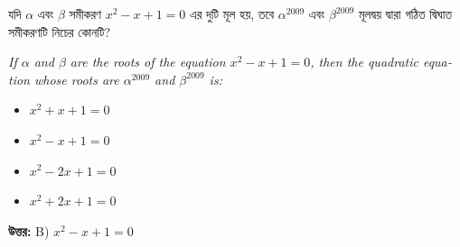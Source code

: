 \documentclass[12pt, a4paper]{article}
\begin{document}
\begin{tcolorbox}[questionbox={প্রশ্ন (Question) 1}]
    \noindent
    যদি $\alpha$ এবং $\beta$ সমীকরণ $x^2 - x + 1 = 0$ এর দুটি মূল হয়, তবে $\alpha^{2009}$ এবং $\beta^{2009}$ মূলদ্বয় দ্বারা গঠিত দ্বিঘাত সমীকরণটি নিচের কোনটি?
    
    \vspace{0.8em}
    \begin{english}
    \noindent\textit{\color{darkgray}
    If $\alpha$ and $\beta$ are the roots of the equation $x^2 - x + 1 = 0$, then the quadratic equation whose roots are $\alpha^{2009}$ and $\beta^{2009}$ is:
    }
    \end{english}
\end{tcolorbox}

\begin{itemize}[label={}, leftmargin=1cm, itemsep=0.5em]
    \item[\textbf{A)}] $x^2 + x + 1 = 0$
    \item[\textbf{B)}] $x^2 - x + 1 = 0$
    \item[\textbf{C)}] $x^2 - 2x + 1 = 0$
    \item[\textbf{D)}] $x^2 + 2x + 1 = 0$
\end{itemize}

\vspace{0.5em}
\begin{tcolorbox}[answerbox]
    \textbf{\color{success} উত্তর:} B) $x^2 - x + 1 = 0$
\end{tcolorbox}
\vspace{1em}
\end{document}
